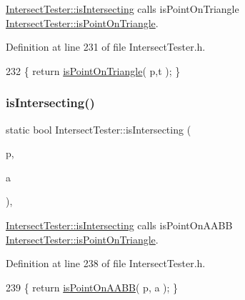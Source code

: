 \hyperlink{class_intersect_tester_a7710e17ff7d2e229059f23b9429213f5}{Intersect\+Tester\+::is\+Intersecting} calls is\+Point\+On\+Triangle  \hyperlink{class_intersect_tester_a04fb92f5e4c68c3f3a91321b94c6011f}{Intersect\+Tester\+::is\+Point\+On\+Triangle}. 



Definition at line 231 of file Intersect\+Tester.\+h.


\begin{DoxyCode}
232     \{ \textcolor{keywordflow}{return} \hyperlink{class_intersect_tester_a04fb92f5e4c68c3f3a91321b94c6011f}{isPointOnTriangle}( p,t ); \}
\end{DoxyCode}
\mbox{\label{class_intersect_tester_a29619798894f9997823c27e73f53236d}} 
\subsubsection{\texorpdfstring{is\+Intersecting()}{isIntersecting()}\hspace{0.1cm}{\footnotesize\ttfamily [5/15]}}
{\footnotesize\ttfamily static bool Intersect\+Tester\+::is\+Intersecting (\begin{DoxyParamCaption}\item[{\hyperlink{class_point}{Point}}]{p,  }\item[{\hyperlink{class_a_a_b_b}{A\+A\+BB}}]{a }\end{DoxyParamCaption})\hspace{0.3cm}{\ttfamily [inline]}, {\ttfamily [static]}}



\hyperlink{class_intersect_tester_a7710e17ff7d2e229059f23b9429213f5}{Intersect\+Tester\+::is\+Intersecting} calls is\+Point\+On\+A\+A\+BB  \hyperlink{class_intersect_tester_a04fb92f5e4c68c3f3a91321b94c6011f}{Intersect\+Tester\+::is\+Point\+On\+Triangle}. 



Definition at line 238 of file Intersect\+Tester.\+h.


\begin{DoxyCode}
239     \{ \textcolor{keywordflow}{return} \hyperlink{class_intersect_tester_a7d951e17cc8d244ea34b3e75d53e5bca}{isPointOnAABB}( p, a ); \}
\end{DoxyCode}
\mbox{\label{class_intersect_tester_a7984196b3e057a2c02a8f2a8d55847e0}} 
